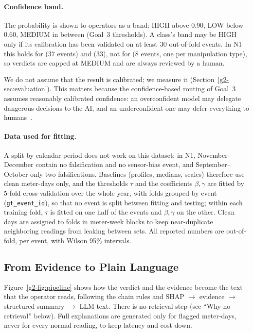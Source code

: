 \paragraph{Confidence band.} The probability is shown to operators as a band: HIGH above 0.90, LOW below
0.60, MEDIUM in between (Goal~3 thresholds). A class's band may be HIGH only if its calibration has been
validated on at least 30 out-of-fold events. In N1 this holds for \GE{} (37 events) and \MF{} (33), not for
\SD{} (8 events, one per manipulation type), so \SD{} verdicts are capped at MEDIUM and are always reviewed by
a human.

We do not assume that the result is calibrated; we measure it (Section~\ref{g2-sec:evaluation}). This matters because the confidence-based routing of Goal~3 assumes reasonably calibrated confidence: an overconfident model may delegate dangerous decisions to the AI, and an underconfident one may defer everything to humans~\cite{trustcal}.

\paragraph{Data used for fitting.} A split by calendar period does not work on this dataset: in N1,
November--December contain no falsification and no sensor-bias event, and September--October only two
falsifications. Baselines (profiles, medians, scales) therefore use clean meter-days only, and the thresholds
$\tau$ and the coefficients $\beta,\gamma$ are fitted by 5-fold cross-validation over the whole year, with folds
grouped by event (\texttt{gt\_event\_id}), so that no event is split between fitting and testing; within each
training fold, $\tau$ is fitted on one half of the events and $\beta,\gamma$ on the other. Clean days are
assigned to folds in meter-week blocks to keep near-duplicate neighboring readings from leaking between sets.
All reported numbers are out-of-fold, per event, with Wilson 95\% intervals.

\subsection{From Evidence to Plain Language}
\label{g2-sec:language}
Figure~\ref{g2-fig:pipeline} shows how the verdict and the evidence become the text that the operator reads,
following the chain rules and SHAP $\rightarrow$ evidence $\rightarrow$ structured summary $\rightarrow$ LLM text.
There is no retrieval step (see ``Why no retrieval'' below). Full explanations are generated only for flagged
meter-days, never for every normal reading, to keep latency and cost down.

